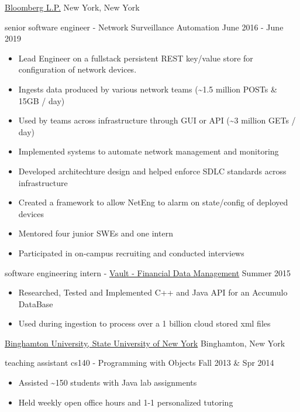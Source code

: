 \documentclass[11pt]{article}
\begin{document}
\headedsection  %
{\href{http://www.bloomberg.com/company}{Bloomberg L.P.}}
{New York, New York}
{
    \headedsubsection
    {senior software engineer - Network Surveillance Automation}
    {June 2016 - June 2019}
    {
        \begin{itemize}
            \item Lead Engineer on a fullstack persistent REST key/value store for configuration of network devices. 
            \item Ingests data produced by various network teams (\textasciitilde{}1.5 million POSTs \& 15GB / day)
            \item Used by teams across infrastructure through GUI or API (\textasciitilde{}3 million GETs / day)
            \item Implemented systems to automate network management and monitoring
            \item Developed architechture design and helped enforce SDLC standards across infrastructure
            \item Created a framework to allow NetEng to alarm on state/config of deployed devices
            \item Mentored four junior SWEs and one intern
            \item Participated in on-campus recruiting and conducted interviews 
        \end{itemize}

    }
    \headedsubsection
    {software engineering intern - \href{https://www.bloomberg.com/professional/product/vault/}{Vault - Financial Data Management}}
    {Summer 2015}
    {
        \begin{itemize}
            \item Researched, Tested and Implemented C++ and Java API for an Accumulo DataBase
            \item Used during ingestion to process over a 1 billion cloud stored xml files
        \end{itemize}
    }
}

\headedsection  %
{\href{http://www.binghamton.edu/index.php}{Binghamton University, State University of New York}}
{Binghamton, New York}
{
    \headedsubsection
    {teaching assistant cs140 - Programming with Objects}
    {Fall 2013 \& Spr 2014}
    {
        \begin{itemize}
            \item Assisted \textasciitilde 150 students with Java lab assignments 
            \item Held weekly open office hours and 1-1 personalized tutoring
        \end{itemize}
    }
}
\end{document}

